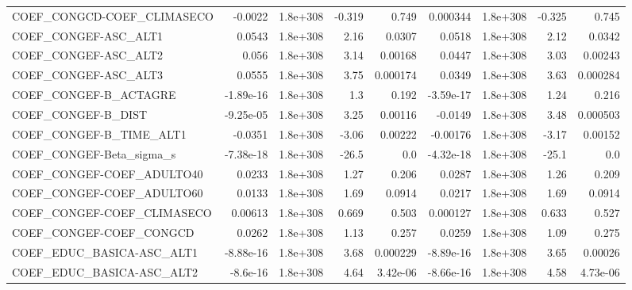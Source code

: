 \begin{tabular}{lrrrrrrrr}
COEF\_CONGCD-COEF\_CLIMASECO        &     -0.0022 &     1.8e+308 &    -0.319 &    0.749 &   0.000344 &    1.8e+308 &       -0.325 &         0.745 \\
COEF\_CONGEF-ASC\_ALT1              &      0.0543 &     1.8e+308 &      2.16 &   0.0307 &     0.0518 &    1.8e+308 &         2.12 &        0.0342 \\
COEF\_CONGEF-ASC\_ALT2              &       0.056 &     1.8e+308 &      3.14 &  0.00168 &     0.0447 &    1.8e+308 &         3.03 &       0.00243 \\
COEF\_CONGEF-ASC\_ALT3              &      0.0555 &     1.8e+308 &      3.75 & 0.000174 &     0.0349 &    1.8e+308 &         3.63 &      0.000284 \\
COEF\_CONGEF-B\_ACTAGRE             &   -1.89e-16 &     1.8e+308 &       1.3 &    0.192 &  -3.59e-17 &    1.8e+308 &         1.24 &         0.216 \\
COEF\_CONGEF-B\_DIST                &   -9.25e-05 &     1.8e+308 &      3.25 &  0.00116 &    -0.0149 &    1.8e+308 &         3.48 &      0.000503 \\
COEF\_CONGEF-B\_TIME\_ALT1           &     -0.0351 &     1.8e+308 &     -3.06 &  0.00222 &   -0.00176 &    1.8e+308 &        -3.17 &       0.00152 \\
COEF\_CONGEF-Beta\_sigma\_s          &   -7.38e-18 &     1.8e+308 &     -26.5 &      0.0 &  -4.32e-18 &    1.8e+308 &        -25.1 &           0.0 \\
COEF\_CONGEF-COEF\_ADULTO40         &      0.0233 &     1.8e+308 &      1.27 &    0.206 &     0.0287 &    1.8e+308 &         1.26 &         0.209 \\
COEF\_CONGEF-COEF\_ADULTO60         &      0.0133 &     1.8e+308 &      1.69 &   0.0914 &     0.0217 &    1.8e+308 &         1.69 &        0.0914 \\
COEF\_CONGEF-COEF\_CLIMASECO        &     0.00613 &     1.8e+308 &     0.669 &    0.503 &   0.000127 &    1.8e+308 &        0.633 &         0.527 \\
COEF\_CONGEF-COEF\_CONGCD           &      0.0262 &     1.8e+308 &      1.13 &    0.257 &     0.0259 &    1.8e+308 &         1.09 &         0.275 \\
COEF\_EDUC\_BASICA-ASC\_ALT1         &   -8.88e-16 &     1.8e+308 &      3.68 & 0.000229 &  -8.89e-16 &    1.8e+308 &         3.65 &       0.00026 \\
COEF\_EDUC\_BASICA-ASC\_ALT2         &    -8.6e-16 &     1.8e+308 &      4.64 & 3.42e-06 &  -8.66e-16 &    1.8e+308 &         4.58 &      4.73e-06 \\

\end{tabular}
